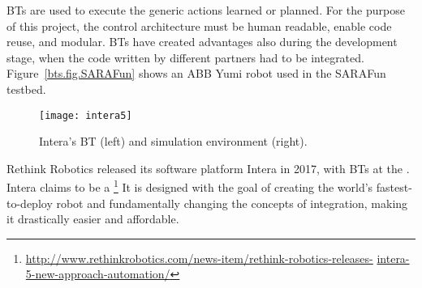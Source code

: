 BTs are used to execute the generic actions learned or planned. For the purpose of this project, the  control architecture  must be human readable, enable code reuse, and modular.
 BTs have  created advantages also during the  development stage, when the code written by different partners had to be integrated. Figure~\ref{bts.fig.SARAFun} shows an ABB Yumi robot used in the SARAFun testbed. 





\begin{figure}[h]
  \texttt{[image: intera5]}
  \caption[Intera's BT (left) and simulation environment (right).]{Intera's BT (left) and simulation environment (right).\footnotemark}
  \label{intera}
\end{figure}


Rethink Robotics released its software platform Intera in 2017, with
BTs  at the . Intera claims to be a \footnote{\url{http://www.rethinkrobotics.com/news-item/rethink-robotics-releases-} \url{intera-5-new-approach-automation/}} It is designed with the goal of creating the world's fastest-to-deploy robot and fundamentally changing the concepts of integration, making it drastically easier and affordable. 




